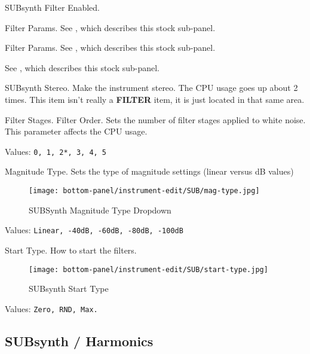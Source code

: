    \setcounter{ItemCounter}{0}      %

   SUBsynth Filter Enabled.

   Filter Params.  See
   ,
   which describes this stock sub-panel.

   Filter Params.  See
   ,
   which describes this stock sub-panel.

   See ,
   which describes this stock sub-panel.

   SUBsynth Stereo.
   Make the instrument stereo. The CPU usage goes up about 2 times.
   This item isn't really a \textbf{FILTER} item, it is just located in that
   same area.

   Filter Stages.  Filter Order.
   Sets the number of filter stages applied to white noise. This parameter
   affects the CPU usage.

   Values: \texttt{0, 1, 2*, 3, 4, 5}

   Magnitude Type.
   Sets the type of magnitude settings (linear versus dB values)

\begin{figure}[H]
   \centering
   \texttt{[image: bottom-panel/instrument-edit/SUB/mag-type.jpg]}
   \caption{SUBSynth Magnitude Type Dropdown}
   \label{fig:subsynth_magnitude_type_dropdown}
\end{figure}

   Values: \texttt{Linear, -40dB, -60dB, -80dB, -100dB}

   Start Type.
   How to start the filters.

\begin{figure}[H]
   \centering
   \texttt{[image: bottom-panel/instrument-edit/SUB/start-type.jpg]}
   \caption{SUBsynth Start Type}
   \label{fig:subsynth_start_type}
\end{figure}

   Values: \texttt{Zero, RND, Max.}

\subsection{SUBsynth / Harmonics}
\label{subsec:subsynth_harmonics}

